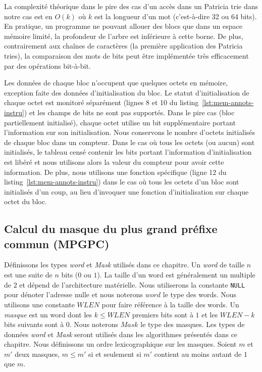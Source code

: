 La complexité théorique dans le pire des cas d'un accès dans un Patricia trie
dans notre cas est en $O(k)$ où $k$ est la longueur d'un mot (c'est-à-dire
32 ou 64 bits).
En pratique, un programme ne pouvant allouer des blocs que dans un
espace mémoire limité, la profondeur de l'arbre est inférieure à cette borne.
De plus, contrairement aux chaînes de caractères (la première application des
Patricia tries), la comparaison des mots de bits peut être implémentée très
efficacement par des opérations bit-à-bit.

Les données de chaque bloc n'occupent que quelques octets en mémoire, exception
faite des données d'initialisation du bloc.
Le statut d'initialisation de chaque octet est monitoré séparément
(lignes 8 et 10 du listing~\ref{lst:mem-annots-instru}) et les champs
de bits ne sont pas supportés.
Dans le pire cas (bloc partiellement initialisé), chaque octet utilise un bit
supplémentaire portant l'information sur son initialisation.
Nous conservons le nombre d'octets initialisés de chaque bloc dans un
compteur.
Dans le cas où tous les octets (ou aucun) sont initialisés, le tableau censé
contenir les bits portant l'information d'initialisation est libéré et nous
utilisons alors la valeur du compteur pour avoir cette information.
De plus, nous utilisons une fonction spécifique (ligne 12 du
listing~\ref{lst:mem-annots-instru}) dans le cas où tous les octets
d'un bloc sont initialisés d'un coup, au lieu d'invoquer une fonction
d'initialisation sur chaque octet du bloc.


\subsection{Calcul du masque du plus grand préfixe commun (MPGPC)}
\label{sec:mpgpc}


Définissons les types {\em word} et {\em Mask} utilisés dans ce chapitre.
Un {\em word} de taille $n$ est une suite de $n$ bits ($0$ ou $1$).
La taille d'un word est généralement un multiple de $2$ et dépend de
l'architecture matérielle.
Nous utiliserons la constante \lstinline'NULL' pour dénoter l'adresse
nulle et nous noterons $word$ le type des words.
Nous utilisons une constante $WLEN$ pour faire référence à la taille des words.
Un {\em masque} est un word dont les $k \le WLEN$ premiers bits sont à $1$ et
les $WLEN-k$ bits suivants sont à $0$.
Nous noterons $Mask$ le type des masques.
Les types de données {\em word} et {\em Mask} seront utilisés dans les
algorithmes présentés dans ce chapitre.
Nous définissons un ordre lexicographique sur les masques.
Soient $m$ et $m'$ deux masques, $m \le m'$ si et seulement si $m'$ contient au
moins autant de $1$ que $m$.

